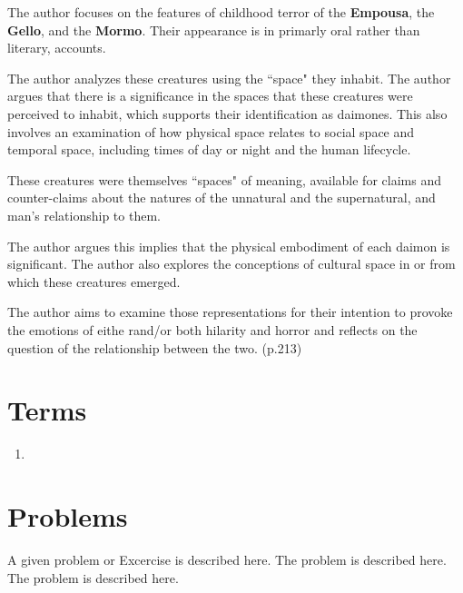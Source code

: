 The author focuses on the features of childhood terror of the \textbf{Empousa}, the \textbf{Gello}, and the \textbf{Mormo}. Their appearance is in primarly oral rather than literary, accounts.

The author analyzes these creatures using the ``space" they inhabit. The author argues that there is a significance in the spaces that these creatures were perceived to inhabit, which supports their identification as daimones. This also involves an examination of how physical space relates to social space and temporal space, including times of day or night and the human lifecycle.

\begin{rmk}
    These creatures were themselves ``spaces" of meaning, available for claims and counter-claims about the natures of the unnatural and the supernatural, and man's relationship to them.
\end{rmk}

The author argues this implies that the physical embodiment of each daimon is significant. The author also explores the conceptions of cultural space in or from which these creatures emerged.

The author aims to examine those representations for their intention to provoke the emotions of eithe rand/or both hilarity and horror and reflects on the question of the relationship between the two. (p.213)


\section{Terms}
\label{sec:terms13}

\begin{enumerate}
	\item
\end{enumerate}

%
%
%


\section*{Problems}
%
\begin{prob}
\label{prob1}
A given problem or Excercise is described here. The
problem is described here. The problem is described here.
\end{prob}



